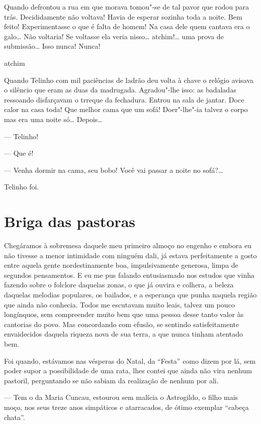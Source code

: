 Quando defrontou a rua em que morava tomou"-se de tal pavor que rodou
para trás. Decididamente não voltava! Havia de esperar sozinha toda a
noite. Bem feito! Experimentasse o que é falta de homem! Na casa dele
quem cantava era o galo\ldots{} Não voltaria! Se voltasse ela veria nisso\ldots{}
atchim!\ldots{} uma prova de submissão\ldots{} Isso nunca!
Nunca!\dotfill{}

\noindent{}\dotfill{}

\noindent{}\dotfill{}atchim\dotfill{}

\noindent{}\dotfill{}

Quando Telinho com mil paciências de ladrão deu volta à chave o relógio
avisava o silêncio que eram as duas da madrugada. Agradou"-lhe isso: as
badaladas ressoando disfarçavam o trreque da fechadura. Entrou na sala
de jantar. Doce calor na casa toda! Que melhor cama que um sofá!
Doer"-lhe"-ia talvez o corpo mas era uma noite só\ldots{} Depois\ldots{}

--- Telinho!

--- Que é!

--- Venha dormir na cama, seu bobo! Você vai passar a noite no
sofá?\ldots{}

Telinho foi.

\chapter{Briga das pastoras}

Chegáramos à sobremesa daquele meu primeiro almoço no engenho e embora
eu não tivesse a menor intimidade com ninguém dali, já estava
perfeitamente a gosto entre aquela gente nordestinamente boa,
impulsivamente generosa, limpa de segundos pensamentos. E eu me pus
falando entusiasmado nos estudos que vinha fazendo sobre o folclore
daquelas zonas, o que já ouvira e colhera, a beleza daquelas melodias
populares, os bailados, e a esperança que punha naquela região que ainda
não conhecia. Todos me escutavam muito leais, talvez um pouco
longínquos, sem compreender muito bem que uma pessoa desse tanto valor
às cantorias do povo. Mas concordando com efusão, se sentindo
satisfeitamente envaidecidos daquela riqueza nova de sua terra, a que
nunca tinham atentado bem.

Foi quando, estávamos nas vésperas do Natal, da ``Festa'' como dizem por
lá, sem poder supor a possibilidade de uma rata, lhes contei que ainda
não vira nenhum pastoril, perguntando se não sabiam da realização de
nenhum por ali.

--- Tem o da Maria Cuncau, estourou sem malícia o Astrogildo, o filho
mais moço, nos seus treze anos simpáticos e atarracados, de ótimo
exemplar ``cabeça chata''.

